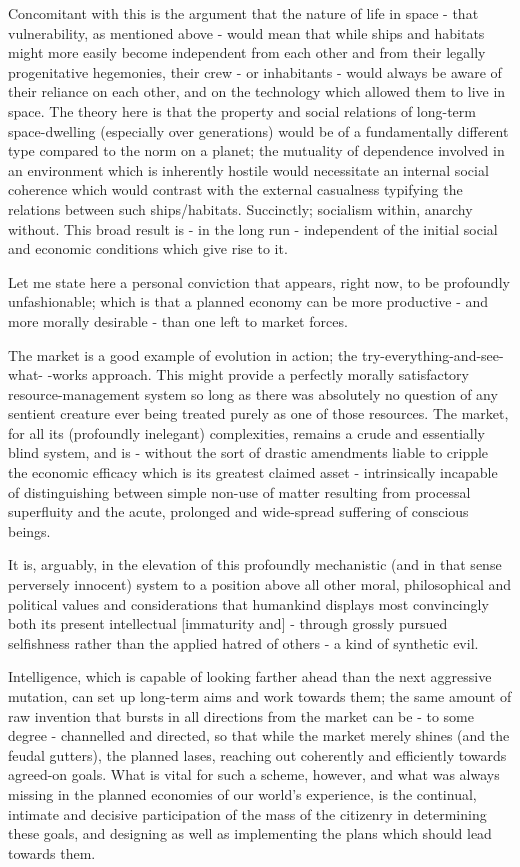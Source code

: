 Concomitant with this is the argument that the nature of life in space - that vulnerability, as mentioned above - would mean that while ships and habitats might more easily become independent from each other and from their legally progenitative hegemonies, their crew - or inhabitants - would always be aware of their reliance on each other, and on the technology which allowed them to live in space. The theory here is that the property and social relations of long-term space-dwelling (especially over generations) would be of a fundamentally different type compared to the norm on a planet; the mutuality of dependence involved in an environment which is inherently hostile would necessitate an internal social coherence which would contrast with the external casualness typifying the relations between such ships/habitats. Succinctly; socialism within, anarchy without. This broad result is - in the long run - independent of the initial social and economic conditions which give rise to it.

Let me state here a personal conviction that appears, right now, to be profoundly unfashionable; which is that a planned economy can be more productive - and more morally desirable - than one left to market forces.

The market is a good example of evolution in action; the try-everything-and-see-what- -works approach. This might provide a perfectly morally satisfactory resource-management system so long as there was absolutely no question of any sentient creature ever being treated purely as one of those resources. The market, for all its (profoundly inelegant) complexities, remains a crude and essentially blind system, and is - without the sort of drastic amendments liable to cripple the economic efficacy which is its greatest claimed asset - intrinsically incapable of distinguishing between simple non-use of matter resulting from processal superfluity and the acute, prolonged and wide-spread suffering of conscious beings.

It is, arguably, in the elevation of this profoundly mechanistic (and in that sense perversely innocent) system to a position above all other moral, philosophical and political values and considerations that humankind displays most convincingly both its present intellectual [immaturity and] - through grossly pursued selfishness rather than the applied hatred of others - a kind of synthetic evil.

Intelligence, which is capable of looking farther ahead than the next aggressive mutation, can set up long-term aims and work towards them; the same amount of raw invention that bursts in all directions from the market can be - to some degree - channelled and directed, so that while the market merely shines (and the feudal gutters), the planned lases, reaching out coherently and efficiently towards agreed-on goals. What is vital for such a scheme, however, and what was always missing in the planned economies of our world's experience, is the continual, intimate and decisive participation of the mass of the citizenry in determining these goals, and designing as well as implementing the plans which should lead towards them.

